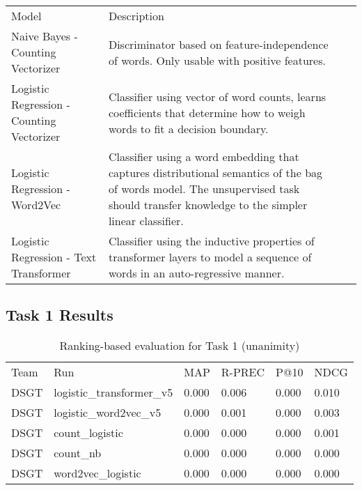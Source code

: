\documentclass[]{style/ceurart}
\begin{document}
\begin{table}
\centering
\begin{tabular}{llll}
Model                                     & Description                                                                                                                                                                           &  &   \\
Naive Bayes - Counting Vectorizer         & Discriminator based on feature-independence of words. Only usable with positive features.                                                                                             &  &   \\
Logistic Regression - Counting Vectorizer & Classifier using vector of word counts, learns coefficients that determine how to weigh words to fit a decision boundary.                                                             &  &   \\
Logistic Regression - Word2Vec            & Classifier using a word embedding that captures distributional semantics of the bag of words model. The unsupervised task should transfer knowledge to the simpler linear classifier. &  &   \\
Logistic Regression - Text Transformer    & Classifier using the inductive properties of transformer layers to model a sequence of words in an auto-regressive manner.~                                                           &  &  
\end{tabular}
\end{table}



\subsection{Task 1 Results}

\begin{table}[]
\caption{Ranking-based evaluation for Task 1 (unanimity)}
\begin{tabular}{llllll}
Team & Run                       & MAP   & R-PREC & P@10 & NDCG  \\
DSGT & logistic\_transformer\_v5 & 0.000 & 0.006  & 0.000                             & 0.010 \\
DSGT & logistic\_word2vec\_v5    & 0.000 & 0.001  & 0.000                             & 0.003 \\
DSGT & count\_logistic           & 0.000 & 0.000  & 0.000                             & 0.001 \\
DSGT & count\_nb                 & 0.000 & 0.000  & 0.000                             & 0.000 \\
DSGT & word2vec\_logistic        & 0.000 & 0.000  & 0.000                             & 0.000
\end{tabular}
\end{table}
\end{document}
